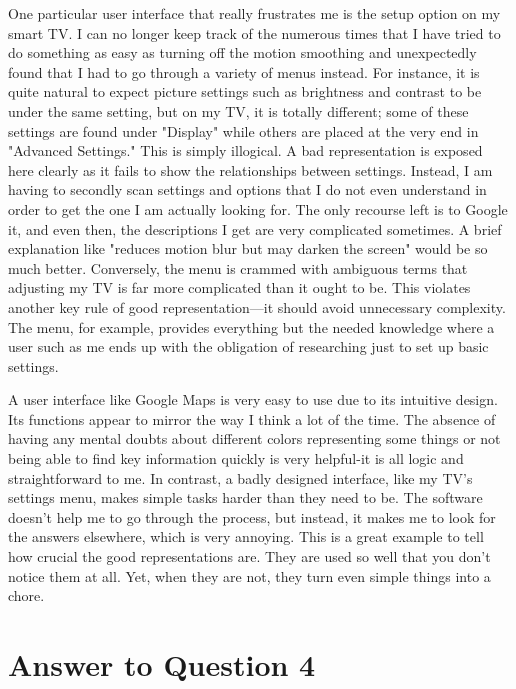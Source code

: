 \documentclass[
	letterpaper, %
]{jdf}
\begin{document}
One particular user interface that really frustrates me is the setup option on my smart TV. I can no longer keep track of the numerous times that I have tried to do something as easy as turning off the motion smoothing and unexpectedly found that I had to go through a variety of menus instead. For instance, it is quite natural to expect picture settings such as brightness and contrast to be under the same setting, but on my TV, it is totally different; some of these settings are found under "Display" while others are placed at the very end in "Advanced Settings." This is simply illogical. A bad representation is exposed here clearly as it fails to show the relationships between settings. Instead, I am having to secondly scan settings and options that I do not even understand in order to get the one I am actually looking for. The only recourse left is to Google it, and even then, the descriptions I get are very complicated sometimes. A brief explanation like "reduces motion blur but may darken the screen" would be so much better. Conversely, the menu is crammed with ambiguous terms that adjusting my TV is far more complicated than it ought to be. This violates another key rule of good representation—it should avoid unnecessary complexity. The menu, for example, provides everything but the needed knowledge where a user such as me ends up with the obligation of researching just to set up basic settings. 

A user interface like Google Maps is very easy to use due to its intuitive design. Its functions appear to mirror the way I think a lot of the time. The absence of having any mental doubts about different colors representing some things or not being able to find key information quickly is very helpful-it is all logic and straightforward to me. In contrast, a badly designed interface, like my TV's settings menu, makes simple tasks harder than they need to be. The software doesn't help me to go through the process, but instead, it makes me to look for the answers elsewhere, which is very annoying. This is a great example to tell how crucial the good representations are. They are used so well that you don't notice them at all. Yet, when they are not, they turn even simple things into a chore. 

\newpage

\section{Answer to Question 4}


\newpage
\end{document}
